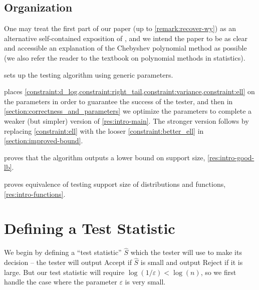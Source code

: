 \documentclass[10pt,a4paper]{article}
\renewcommand{\epsilon}{\varepsilon}
\begin{document}
\subsection{Organization}

One may treat the first part of our paper (up to \cref{remark:recover-wy}) as an
alternative self-contained exposition of \cite{WY19}, and we intend the paper to be as clear and
accessible an explanation of the Chebyshev polynomial method as possible (we also refer the reader
to the textbook \cite{WY20} on polynomial methods in statistics).

\begin{description}[topsep=0pt,itemsep=0em]
\item[\cref{section:test-statistic}] sets up the testing algorithm using generic parameters.
\item[\cref{section:parameters}] places
\cref{constraint:d_log,constraint:right_tail,constraint:variance,constraint:ell} on the parameters
in order to guarantee the success of the tester, and then in
\cref{section:correctness_and_parameters} we optimize the parameters to complete a weaker (but
simpler) version of \cref{res:intro-main}. The stronger version follows by replacing
\cref{constraint:ell} with the looser \cref{constraint:better_ell} in \cref{section:improved-bound}.
\item[\cref{section:good-lower-bound}] proves that the algorithm outputs a lower bound on
support size, \cref{res:intro-good-lb}.
\item[\cref{section:functions}] proves equivalence of testing support size of
distributions and functions, \cref{res:intro-functions}.
\end{description}

\section{Defining a Test Statistic}
\label{section:test-statistic}

We begin by defining a ``test statistic'' $\widehat S$ which the tester will use to make its
decision -- the tester will output \textsf{Accept} if $\widehat S$ is small and output
\textsf{Reject} if it is large. But our test statistic will require $\log(1/\epsilon) < \log(n)$, so
we first handle the case where the parameter $\epsilon$ is very small.
\end{document}
